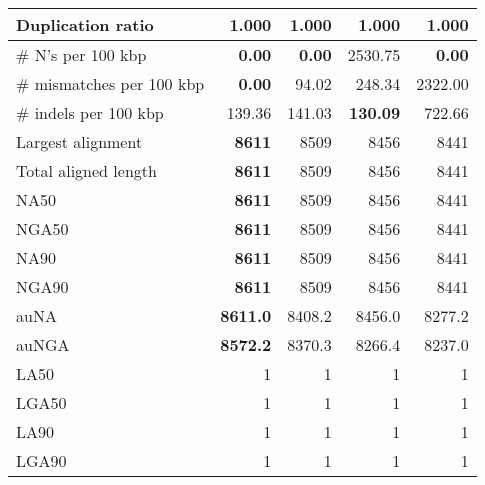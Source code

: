 \documentclass[12pt,a4paper]{article}
\begin{document}
\begin{table}[ht]
\begin{center}
\begin{tabular}{|l*{4}{|r}|}
Duplication ratio & 1.000 & 1.000 & 1.000 & 1.000 \\ \hline
\# N's per 100 kbp & {\bf 0.00} & {\bf 0.00} & 2530.75 & {\bf 0.00} \\ \hline
\# mismatches per 100 kbp & {\bf 0.00} & 94.02 & 248.34 & 2322.00 \\ \hline
\# indels per 100 kbp & 139.36 & 141.03 & {\bf 130.09} & 722.66 \\ \hline
Largest alignment & {\bf 8611} & 8509 & 8456 & 8441 \\ \hline
Total aligned length & {\bf 8611} & 8509 & 8456 & 8441 \\ \hline
NA50 & {\bf 8611} & 8509 & 8456 & 8441 \\ \hline
NGA50 & {\bf 8611} & 8509 & 8456 & 8441 \\ \hline
NA90 & {\bf 8611} & 8509 & 8456 & 8441 \\ \hline
NGA90 & {\bf 8611} & 8509 & 8456 & 8441 \\ \hline
auNA & {\bf 8611.0} & 8408.2 & 8456.0 & 8277.2 \\ \hline
auNGA & {\bf 8572.2} & 8370.3 & 8266.4 & 8237.0 \\ \hline
LA50 & 1 & 1 & 1 & 1 \\ \hline
LGA50 & 1 & 1 & 1 & 1 \\ \hline
LA90 & 1 & 1 & 1 & 1 \\ \hline
LGA90 & 1 & 1 & 1 & 1 \\ \hline
\end{tabular}
\end{center}
\end{table}
\end{document}
